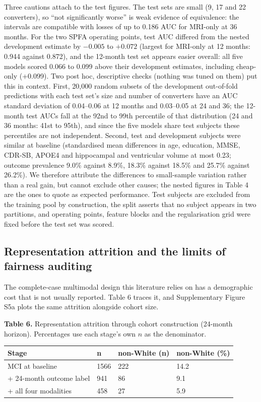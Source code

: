 \documentclass[12pt,twoside]{article}
\begin{document}
\begin{spacing}{1.0}
Three cautions attach to the test figures. The test sets are small (9, 17
and 22 converters), so ``not significantly worse'' is weak evidence of
equivalence: the intervals are compatible with losses of up to 0.186 AUC for
MRI-only at 36 months. For the two SPFA operating points, test AUC differed
from the nested development estimate by $-0.005$ to $+0.072$ (largest for
MRI-only at 12 months: 0.944 against 0.872), and the 12-month test set
appears easier overall: all five models scored 0.066 to 0.099 above their
development estimates, including cheap-only (+0.099). Two post hoc, descriptive checks (nothing was tuned on them) put this in context. First, 20,000 random subsets
of the development out-of-fold predictions with each test set's size and number of converters have an AUC
standard deviation of 0.04--0.06 at 12 months and 0.03--0.05 at 24 and 36; the 12-month test AUCs fall at the
92nd to 99th percentile of that distribution (24 and 36 months: 41st to 95th), and since the five models
share test subjects these percentiles are not independent. Second, test and development subjects were
similar at baseline (standardised mean differences in age, education, MMSE, CDR-SB, APOE4 and hippocampal
and ventricular volume at most 0.23; outcome prevalence 9.0\% against 8.9\%, 18.3\% against 18.5\% and
25.7\% against 26.2\%). We therefore attribute the differences to small-sample variation rather than a
real gain, but cannot exclude other causes; the nested figures in Table 4 are the ones to quote as
expected performance. Test subjects are excluded from the training pool by construction, the split asserts that no subject appears in
two partitions, and operating points, feature blocks and the regularisation grid were fixed before the test
set was scored.

\subsection{Representation attrition and the limits of fairness auditing}
The complete-case multimodal design this literature relies on has a
demographic cost that is not usually reported. Table 6 traces it, and
Supplementary Figure S5a plots the same attrition alongside cohort size.

\begin{table}[!htbp]
\centering
\textbf{Table 6.} Representation attrition through cohort construction
(24-month horizon). Percentages use each stage's own $n$ as the denominator.\\\vspace{5pt}
\begin{tabular}{|M{5.6cm}|M{1.6cm}|M{3.1cm}|M{3.1cm}|}
\hline
\textbf{Stage} & \textbf{n} & \textbf{non-White (n)} & \textbf{non-White (\%)} \\
\hline
MCI at baseline & 1566 & 222 & 14.2 \\\hline
+ 24-month outcome label & 941 & 86 & 9.1 \\\hline
+ all four modalities & 458 & 27 & 5.9 \\\hline
\end{tabular}
\end{table}



\end{spacing}
\end{document}
